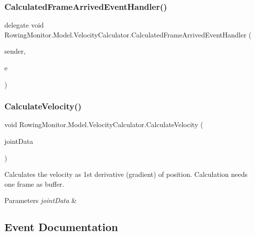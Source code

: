 \subsubsection{\texorpdfstring{Calculated\+Frame\+Arrived\+Event\+Handler()}{CalculatedFrameArrivedEventHandler()}}
{\footnotesize\ttfamily delegate void Rowing\+Monitor.\+Model.\+Velocity\+Calculator.\+Calculated\+Frame\+Arrived\+Event\+Handler (\begin{DoxyParamCaption}\item[{Object}]{sender,  }\item[{\hyperlink{class_rowing_monitor_1_1_model_1_1_calculated_frame_arrived_event_args}{Calculated\+Frame\+Arrived\+Event\+Args}}]{e }\end{DoxyParamCaption})}

\mbox{\label{class_rowing_monitor_1_1_model_1_1_velocity_calculator_a49c8bd67bb150dbd6e1e7c3ed31dc699}} 
\subsubsection{\texorpdfstring{Calculate\+Velocity()}{CalculateVelocity()}}
{\footnotesize\ttfamily void Rowing\+Monitor.\+Model.\+Velocity\+Calculator.\+Calculate\+Velocity (\begin{DoxyParamCaption}\item[{\hyperlink{struct_rowing_monitor_1_1_model_1_1_util_1_1_joint_data}{Joint\+Data}}]{joint\+Data }\end{DoxyParamCaption})}



Calculates the velocity as 1st derivative (gradient) of position. Calculation needs one frame as buffer. 


\begin{DoxyParams}{Parameters}
{\em joint\+Data} & \\
\hline
\end{DoxyParams}


\subsection{Event Documentation}
\mbox{\label{class_rowing_monitor_1_1_model_1_1_velocity_calculator_a0da4ec78b2279bb46e43c9e35914e573}} 
